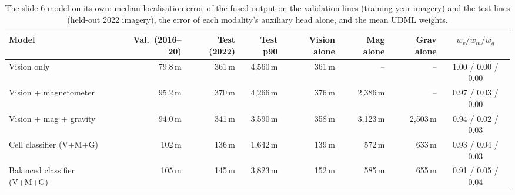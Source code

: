 \begin{table}[t]
\centering
\small
\caption{The slide-6 model on its own: median localisation error of the fused output on the validation lines (training-year imagery) and the test lines (held-out 2022 imagery), the error of each modality's auxiliary head alone, and the mean UDML weights.}
\label{tab:baseline}
\begin{adjustbox}{max width=\linewidth}
\begin{tabular}{lrrrrrrc}
\toprule
Model & Val.\ (2016--20) & Test (2022) & Test p90 & Vision alone & Mag alone & Grav alone & $w_v / w_m / w_g$ \\
\midrule
Vision only & 79.8\,m & 361\,m & 4{,}560\,m & 361\,m & -- & -- & 1.00 / 0.00 / 0.00 \\
Vision + magnetometer & 95.2\,m & 370\,m & 4{,}266\,m & 376\,m & 2{,}386\,m & -- & 0.97 / 0.03 / 0.00 \\
Vision + mag + gravity & 94.0\,m & 341\,m & 3{,}590\,m & 358\,m & 3{,}123\,m & 2{,}503\,m & 0.94 / 0.02 / 0.03 \\
Cell classifier (V+M+G) & 102\,m & 136\,m & 1{,}642\,m & 139\,m & 572\,m & 633\,m & 0.93 / 0.04 / 0.03 \\
Balanced classifier (V+M+G) & 105\,m & 145\,m & 3{,}823\,m & 152\,m & 585\,m & 655\,m & 0.91 / 0.05 / 0.04 \\
\bottomrule
\end{tabular}
\end{adjustbox}
\end{table}
